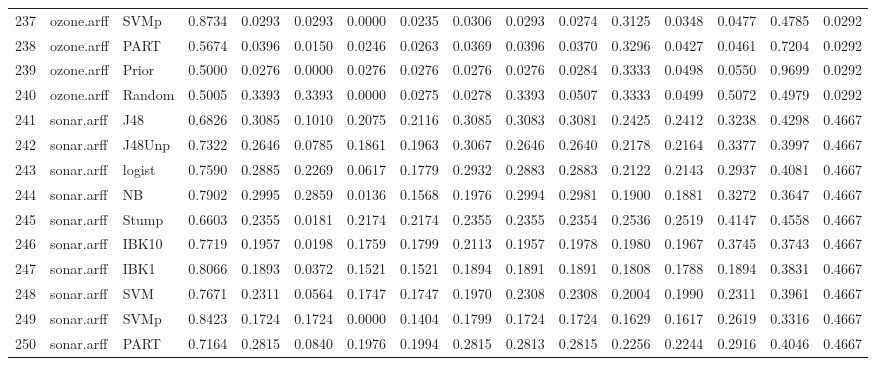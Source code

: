 \documentclass {article}
\begin{document}
\begin{table}[ht]
\begin{tabular}{rllrrrrrrrrrrrrr}
  237 & ozone.arff & SVMp & 0.8734 & 0.0293 & 0.0293 & 0.0000 & 0.0235 & 0.0306 & 0.0293 & 0.0274 & 0.3125 & 0.0348 & 0.0477 & 0.4785 & 0.0292 \\ 
  238 & ozone.arff & PART & 0.5674 & 0.0396 & 0.0150 & 0.0246 & 0.0263 & 0.0369 & 0.0396 & 0.0370 & 0.3296 & 0.0427 & 0.0461 & 0.7204 & 0.0292 \\ 
  239 & ozone.arff & Prior & 0.5000 & 0.0276 & 0.0000 & 0.0276 & 0.0276 & 0.0276 & 0.0276 & 0.0284 & 0.3333 & 0.0498 & 0.0550 & 0.9699 & 0.0292 \\ 
  240 & ozone.arff & Random & 0.5005 & 0.3393 & 0.3393 & 0.0000 & 0.0275 & 0.0278 & 0.3393 & 0.0507 & 0.3333 & 0.0499 & 0.5072 & 0.4979 & 0.0292 \\ 
  241 & sonar.arff & J48 & 0.6826 & 0.3085 & 0.1010 & 0.2075 & 0.2116 & 0.3085 & 0.3083 & 0.3081 & 0.2425 & 0.2412 & 0.3238 & 0.4298 & 0.4667 \\ 
  242 & sonar.arff & J48Unp & 0.7322 & 0.2646 & 0.0785 & 0.1861 & 0.1963 & 0.3067 & 0.2646 & 0.2640 & 0.2178 & 0.2164 & 0.3377 & 0.3997 & 0.4667 \\ 
  243 & sonar.arff & logist & 0.7590 & 0.2885 & 0.2269 & 0.0617 & 0.1779 & 0.2932 & 0.2883 & 0.2883 & 0.2122 & 0.2143 & 0.2937 & 0.4081 & 0.4667 \\ 
  244 & sonar.arff & NB & 0.7902 & 0.2995 & 0.2859 & 0.0136 & 0.1568 & 0.1976 & 0.2994 & 0.2981 & 0.1900 & 0.1881 & 0.3272 & 0.3647 & 0.4667 \\ 
  245 & sonar.arff & Stump & 0.6603 & 0.2355 & 0.0181 & 0.2174 & 0.2174 & 0.2355 & 0.2355 & 0.2354 & 0.2536 & 0.2519 & 0.4147 & 0.4558 & 0.4667 \\ 
  246 & sonar.arff & IBK10 & 0.7719 & 0.1957 & 0.0198 & 0.1759 & 0.1799 & 0.2113 & 0.1957 & 0.1978 & 0.1980 & 0.1967 & 0.3745 & 0.3743 & 0.4667 \\ 
  247 & sonar.arff & IBK1 & 0.8066 & 0.1893 & 0.0372 & 0.1521 & 0.1521 & 0.1894 & 0.1891 & 0.1891 & 0.1808 & 0.1788 & 0.1894 & 0.3831 & 0.4667 \\ 
  248 & sonar.arff & SVM & 0.7671 & 0.2311 & 0.0564 & 0.1747 & 0.1747 & 0.1970 & 0.2308 & 0.2308 & 0.2004 & 0.1990 & 0.2311 & 0.3961 & 0.4667 \\ 
  249 & sonar.arff & SVMp & 0.8423 & 0.1724 & 0.1724 & 0.0000 & 0.1404 & 0.1799 & 0.1724 & 0.1724 & 0.1629 & 0.1617 & 0.2619 & 0.3316 & 0.4667 \\ 
  250 & sonar.arff & PART & 0.7164 & 0.2815 & 0.0840 & 0.1976 & 0.1994 & 0.2815 & 0.2813 & 0.2815 & 0.2256 & 0.2244 & 0.2916 & 0.4046 & 0.4667 \\ 

\end{tabular}
\end{table}
\end{document}
